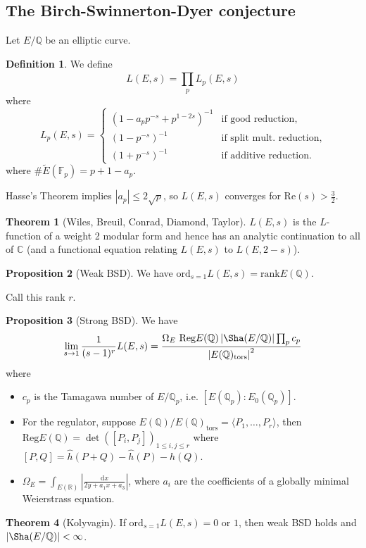 \documentclass{article}
\theoremstyle{definition}
\newtheorem{theorem}{Theorem}[section]
\newtheorem{prop}[theorem]{Proposition}
\newtheorem{defn}{Definition}[section]
\begin{document}
\subsection{The Birch-Swinnerton-Dyer conjecture}
Let $E/\mathbb{Q}$ be an elliptic curve.
\begin{defn}
    We define $$L(E,s) = \prod_{p}^{} L_p(E,s)$$ where $$L_p(E,s) = \begin{cases}
        (1-a_p p^{-s}+p^{1-2s})^{-1} &\text{if good reduction,}\\
        (1-p^{-s})^{-1} &\text{if split mult. reduction,}\\
        (1+p^{-s})^{-1} &\text{if additive reduction}.
    \end{cases}$$
    where $\#\widetilde{E}(\mathbb{F}_p)=p+1-a_p$.
\end{defn}
Hasse's Theorem implies $\left|a_p\right|\le 2\sqrt{p}$, so $L(E,s)$ converges for $\text{Re}(s)>\frac{3}{2}$.
\begin{theorem}[Wiles, Breuil, Conrad, Diamond, Taylor]
    $L(E,s)$ is the $L$-function of a weight 2 modular form and hence has an analytic continuation to all of $\mathbb{C}$ (and a functional equation relating $L(E,s)$ to $L(E,2-s)$).
\end{theorem}
\begin{prop}[Weak BSD]
    We have $\text{ord}_{s=1}L(E,s)= \text{rank}E(\mathbb{Q})$.
\end{prop}
Call this rank $r$.
\begin{prop}[Strong BSD]
    We have
    \begin{align*}
        \lim_{s \to 1} \frac{1}{(s-1)^r}L(E,s) = \frac{\Omega_E ~ \text{Reg}E(\mathbb{Q})\left|\Sha(E/\mathbb{Q})\right|\prod_{p}^{} c_p}{\left|E(\mathbb{Q})_{\text{tors}}\right|^2}
    \end{align*}
    where 
    \begin{itemize}
        \item $c_p$ is the Tamagawa number of $E/\mathbb{Q}_p$, i.e. $[E(\mathbb{Q}_p):E_0(\mathbb{Q}_p)]$.
        \item For the regulator, suppose $E(\mathbb{Q})/E(\mathbb{Q})_{\text{tors}} = \langle P_1,\ldots,P_r \rangle$, then $\text{Reg}E(\mathbb{Q}) = \det([P_i,P_j])_{1\le i,j\le r}$ where $[P,Q] = \widehat{h}(P+Q)-\widehat{h}(P)-\widehat{h}(Q)$.
        \item $\Omega_E = \int_{E(\mathbb{R})}^{} \left|\frac{\mathrm{d}x}{2y+a_1x+a_3}\right|$, where $a_i$ are the coefficients of a globally minimal Weierstrass equation.
    \end{itemize}
\end{prop}
\begin{theorem}[Kolyvagin]
    If $\text{ord}_{s=1}L(E,s)=0$ or $1$, then weak BSD holds and $\left|\Sha(E/\mathbb{Q})\right|<\infty$.
\end{theorem}
\end{document}
